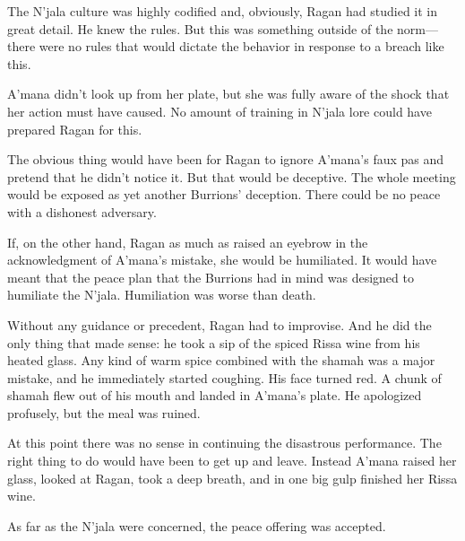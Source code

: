 \documentclass[12pt]{book}
\begin{document}
The N'jala culture was highly codified and, obviously, Ragan had studied it in great detail. He knew the rules. But this was something outside of the norm---there were no rules that would dictate the behavior in response to a breach like this. 

A'mana didn't look up from her plate, but she was fully aware of the shock that her action must have caused. No amount of training in N'jala lore could have prepared Ragan for this. 

The obvious thing would have been for Ragan to ignore A'mana's faux pas and pretend that he didn't notice it. But that would be deceptive. The whole meeting would be exposed as yet another Burrions' deception. There could be no peace with a dishonest adversary. 

If, on the other hand, Ragan as much as raised an eyebrow in the acknowledgment of A'mana's mistake, she would be humiliated. It would have meant that the peace plan that the Burrions had in mind was designed to humiliate the N'jala. Humiliation was worse than death.

Without any guidance or precedent, Ragan had to improvise. And he did the only thing that made sense: he took a sip of the spiced Rissa wine from his heated glass. Any kind of warm spice combined with the shamah was a major mistake, and he immediately started coughing. His face turned red. A chunk of shamah flew out of his mouth and landed in A'mana's plate. He apologized profusely, but the meal was ruined. 

At this point there was no sense in continuing the disastrous performance. The right thing to do would have been to get up and leave. Instead A'mana raised her glass, looked at Ragan, took a deep breath, and in one big gulp finished her Rissa wine. 

As far as the N'jala were concerned, the peace offering was accepted.
\end{document}
